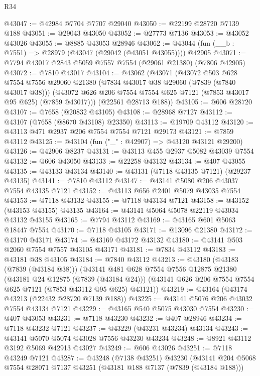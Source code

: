 \begin{lexlean}{R34}
\begin{coremodule}
@43047 := @42984 @7704 @7707 @29040
@43050 := @22199 @28720 @7139 @188
@43051 := @29043 @43050
@43052 := @27773 @7136
@43053 := @43052 @43026
@43055 := @8885 @43053 @28946
@43062 := @43044 (fun (__b : @7551) => @28979 (@43047 (@29042 (@43051 @43055)))) @42905
@43071 := @7794 @43017 @2843 @5059 @7557 @7554 (@29061 @21380) (@7806 @42905)
@43072 := @7810 @43017
@43104 := @43062
    (@43071
      (@43072
        @503
        @628
        @7554
        @7556
        @29060
        @21380
        (@7834 @43017 @38 @29060 (@7839 (@7840 @43017 @38)))
        (@43072 @626 @206 @7554 @7554 @625 @7121 (@7853 @43017 @95 @625) (@7859 @43017)))
      (@22561 @28713 @188))
@43105 := @606 @28720
@43107 := @7658 (@20832 @43105)
@43108 := @28968 @7127
@43112 := @43107 (@7658 (@8670 @43108) @23350)
@43113 := @19709 @43112
@43120 := @43113 @471 @2937 @206 @7554 @7554 @7121 @29173
@43121 := @7859 @43112
@43125 := @43104 (fun ("_" : @42907) => @43120 @43121 @29200)
@43126 := @42906 @8237
@43131 := @43113 @455 @2937 @5082 @43039 @7554
@43132 := @606 @43050
@43133 := @22258 @43132
@43134 := @407 @43055
@43135 := @43133 @43134
@43140 := @43131 (@7118 @43135 @7121) (@29237 @43135)
@43141 := @7810 @43112
@43147 := @43141 @5080 @206 @43037 @7554 @43135 @7121
@43152 := @43113 @656 @2401 @5079 @43035 @7554
@43153 := @7118 @43132
@43155 := @7118 @43134 @7121
@43158 := @43152 (@43153 @43155) @43135
@43164 := @43141 @5064 @5078 @22119 @43034 @43132 @43155
@43165 := @7794 @43112
@43169 := @43165 @601 @5063 @18447 @7554
@43170 := @7118 @43105
@43171 := @13096 @21380
@43172 := @43170 @43171
@43174 := @43169 @43172 @43132
@43180 := @43141 @503 @2060 @7554 @7557 @43105 @43171
@43181 := @7834 @43112
@43183 := @43181 @38 @43105
@43184 := @7840 @43112
@43213 := @43180
    (@43183 (@7839 (@43184 @38)))
    (@43141
      @481
      @628
      @7554
      @7556
      @12875
      @21380
      (@43181 @24 @12875 (@7839 (@43184 @24)))
      (@43141 @626 @206 @7554 @7554 @625 @7121 (@7853 @43112 @95 @625) @43121))
@43219 := @43164 (@43174 @43213 (@22432 @28720 @7139 @188))
@43225 := @43141 @5076 @206 @43032 @7554 @43134 @7121
@43229 := @43165 @540 @5075 @43030 @7554
@43230 := @407 @43053
@43231 := @7118 @43230
@43232 := @407 @28946
@43234 := @7118 @43232 @7121
@43237 := @43229 (@43231 @43234) @43134
@43243 := @43141 @5070 @5074 @43028 @7556 @43230 @43234
@43248 := @8921 @43112 @3192 @5069 @42913 @43027
@43249 := @606 @43026
@43251 := @7118 @43249 @7121
@43287 := @43248
    (@7138 @43251)
    @43230
    (@43141
      @204
      @5068
      @7554
      @28071
      @7137
      @43251
      (@43181 @188 @7137 (@7839 (@43184 @188)))

\end{coremodule}
\end{lexlean}
